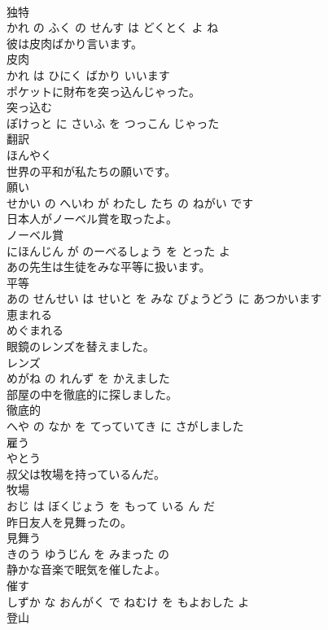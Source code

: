 \documentclass[8pt]{extreport}
\begin{document}
\begin{CJK}{UTF8}{min}
\\	独特 
\\	かれ の ふく の せんす は どくとく よ ね			
\\	彼は皮肉ばかり言います。	
\\	皮肉 
\\	かれ は ひにく ばかり いいます			
\\	ポケットに財布を突っ込んじゃった。	
\\	突っ込む 
\\	ぽけっと に さいふ を つっこん じゃった			
\\	翻訳	
\\	ほんやく		
\\	世界の平和が私たちの願いです。	
\\	願い 
\\	せかい の へいわ が わたし たち の ねがい です			
\\	日本人がノーベル賞を取ったよ。	
\\	ノーベル賞 
\\	にほんじん が のーべるしょう を とった よ			
\\	あの先生は生徒をみな平等に扱います。	
\\	平等 
\\	あの せんせい は せいと を みな びょうどう に あつかいます			
\\	恵まれる	
\\	めぐまれる		
\\	眼鏡のレンズを替えました。	
\\	レンズ 
\\	めがね の れんず を かえました			
\\	部屋の中を徹底的に探しました。	
\\	徹底的 
\\	へや の なか を てっていてき に さがしました			
\\	雇う	
\\	やとう		
\\	叔父は牧場を持っているんだ。	
\\	牧場 
\\	おじ は ぼくじょう を もって いる ん だ			
\\	昨日友人を見舞ったの。	
\\	見舞う 
\\	きのう ゆうじん を みまった の			
\\	静かな音楽で眠気を催したよ。	
\\	催す 
\\	しずか な おんがく で ねむけ を もよおした よ			
\\	登山	

\end{CJK}
\end{document}
